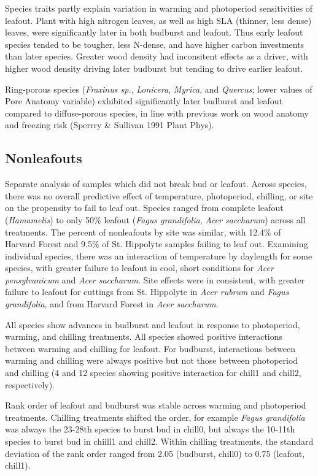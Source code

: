 \documentclass{article}
\begin{document}
Species traits partly explain variation in warming and photoperiod sensitivities of leafout. 
Plant with high nitrogen leaves, as well as high SLA (thinner, less dense) leaves, were significantly later in both budburst and leafout. Thus early leafout species tended to be tougher, less N-dense, and have higher carbon investments than later species. Greater wood density had inconsitent effects as a driver, with higher wood density driving later budburst but tending to drive earlier leafout.

Ring-porous species (\emph{Fraxinus sp.}, \emph{Lonicera}, \emph{Myrica}, and \emph{Quercus}; lower values of Pore Anatomy variable) exhibited significantly later budburst and leafout compared to diffuse-porous species, in line with previous work on wood anatomy and freezing risk (Sperrry \& Sullivan 1991 Plant Phys).

\subsection*{Nonleafouts}

Separate analysis of samples which did not break bud or leafout. Across species, there was no overall predictive effect of temperature, photoperiod, chilling, or site on the propensity to fail to leaf out. 
Species ranged from complete leafout (\emph{Hamamelis}) to only 50\% leafout (\emph{Fagus grandifolia}, \emph{Acer saccharum}) across all treatments. The percent of nonleafouts by site was similar, with 12.4\% of Harvard Forest and 9.5\% of St. Hippolyte samples failing to leaf out. Examining individual species,  there was an interaction of temperature by daylength for some species, with greater failure to leafout in cool, short conditions for \emph{Acer pensylvanicum}  and \emph{Acer saccharum}. Site effects were in consistent, with greater failure to leafout for cuttings from St. Hippolyte in \emph{Acer rubrum} and \emph{Fagus grandifolia}, and from Harvard Forest in \emph{Acer saccharum}.

All species show advances in budburst and leafout in response to photoperiod, warming, and chilling treatments. All species showed positive interactions between warming and chilling for leafout. For budburst, interactions between warming and chilling were always positive but not those between photoperiod and chilling (4 and 12 species showing positive interaction for chill1 and chill2, respectively).

Rank order of leafout and budburst was stable across warming and photoperiod treatments. Chilling treatments shifted the order, for example \emph{Fagus grandifolia} was always the 23-28th species to burst bud in chill0, but always the 10-11th species to burst bud in chiill1 and chill2. Within chilling treatments, the standard deviation of the rank order ranged from 2.05 (budburst, chill0) to 0.75 (leafout, chill1). 
\end{document}
